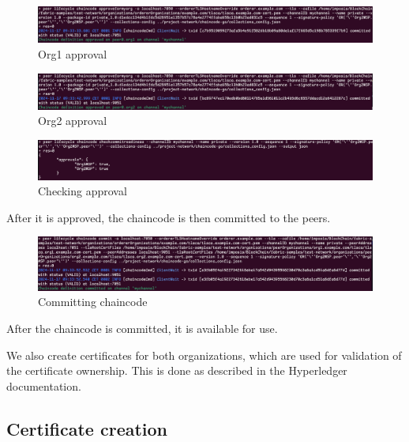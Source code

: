 \documentclass[12pt]{article}
\begin{document}
\begin{figure}[H]
    \centering
    \includegraphics[width=\textwidth]{imgs/org1_approval.PNG}
    \caption{Org1 approval}
    \label{fig:org1approval}
\end{figure}

\begin{figure}[H]
    \centering
    \includegraphics[width=\textwidth]{imgs/org2_approval.PNG}
    \caption{Org2 approval}
    \label{fig:org1approval}
\end{figure}

\begin{figure}[H]
    \centering
    \includegraphics[width=\textwidth]{imgs/checking_approval.PNG}
    \caption{Checking approval}
    \label{fig:checkingapproval}
\end{figure}

After it is approved, the chaincode is then committed to the peers.

\begin{figure}[H]
    \centering
    \includegraphics[width=\textwidth]{imgs/commiting_chaincode.PNG}
    \caption{Committing chaincode}
    \label{fig:commitingchaincode}
\end{figure}

After the chaincode is committed, it is available for use.

We also create certificates for both organizations, which are used for validation of the certificate ownership. This is done as described in the Hyperledger documentation.

\subsection{Certificate creation}
\end{document}
